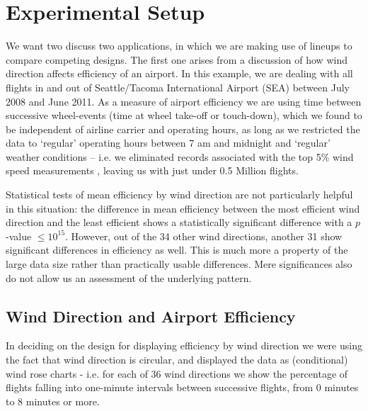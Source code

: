 \section{Experimental Setup}
We want two discuss two applications, in which we are making use of lineups to compare competing designs. 
The first one arises from a discussion of how wind direction affects efficiency of an airport. In this example, we are dealing with all flights \cite{rita} in and out of Seattle/Tacoma International Airport (SEA) between July 2008 and June 2011. As a measure of airport efficiency we are using time between successive wheel-events (time at wheel take-off or touch-down), which we found to be independent of airline carrier and operating hours, as long as we restricted the data to `regular' operating hours between 7 am and midnight and `regular' weather conditions -- i.e. we eliminated records associated with the top 5\% wind speed measurements \cite{noaa-weather}, leaving us with just under 0.5 Million flights.

Statistical tests of mean efficiency by wind direction are not particularly helpful in this situation:
the difference in mean efficiency between the most efficient wind direction and the least efficient shows a statistically significant difference with a $p$-value $\le 10^{15}$. %
However, out of the 34 other wind directions,  another 31 show significant differences in efficiency as well. This is much more a property of the large data size rather than practically usable differences. Mere significances also do not allow us an assessment of the underlying pattern.

\subsection{Wind Direction and Airport Efficiency}
In deciding on the design for displaying efficiency  by wind direction we were using the fact that wind direction is circular, and  displayed the data as (conditional) wind rose charts - i.e. for each of 36 wind directions we show the percentage of flights falling into one-minute intervals between successive flights, from  0 minutes to 8 minutes or more.


